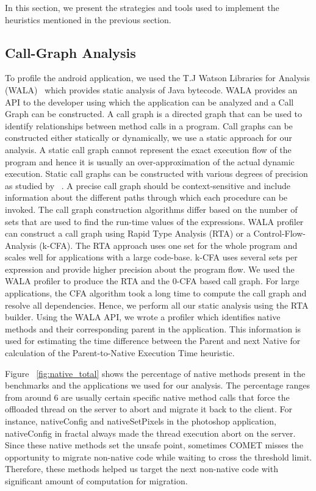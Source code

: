 In this section, we present the strategies and tools used to implement the heuristics mentioned in the previous section.
\subsection{Call-Graph Analysis}
To profile the android application, we used the T.J Watson Libraries for Analysis (WALA)~\cite{wala} which provides static analysis
of Java bytecode. WALA provides an API to the developer using which the application can be analyzed and a Call Graph can be
constructed. A call graph is a directed graph that can be used to identify relationships between method calls in a program.
Call graphs can be constructed either statically or dynamically, we use a static approach for our analysis. A static
call graph cannot represent the exact execution flow of the program and hence it is usually an over-approximation of
the actual dynamic execution. Static call graphs can be constructed with various degrees of precision as studied by
~\cite{cgbuild}. A precise call graph should be context-sensitive and include information about the different paths through which
each procedure can be invoked. The call graph construction algorithms differ based on the number of sets that are used to find the
run-time values of the expressions. WALA profiler can construct a call graph using Rapid Type Analysis (RTA) or a Control-Flow-Analysis
(k-CFA). The RTA approach uses one set for the whole program and scales well for applications with a large code-base. k-CFA uses
several sets per expression and provide higher precision about the program flow.
We used the WALA profiler to produce the RTA and the 0-CFA based call graph. For large applications, the CFA algorithm took a long time to
compute the call graph and resolve all dependencies. Hence, we perform all our static analysis using the RTA builder. Using the WALA API,
we wrote a profiler which identifies native methods and their corresponding parent in the application.
This information is used for estimating the time difference between the Parent and next Native for calculation of the Parent-to-Native Execution
Time heuristic.

Figure ~\ref{fig:native_total} shows the percentage of native methods present in the benchmarks and the applications we used for our analysis.
The percentage ranges from around 6%
are usually certain specific native method calls that force the offloaded thread on the server to abort and migrate it back to the client. For instance, nativeConfig
and nativeSetPixels in the photoshop application, nativeConfig in fractal always made the thread execution abort on the server. Since these native methods set the unsafe point, sometimes COMET misses the opportunity to migrate non-native code while waiting to cross the threshold limit. Therefore, these methods helped us target the next non-native code with significant amount of computation for migration. 

